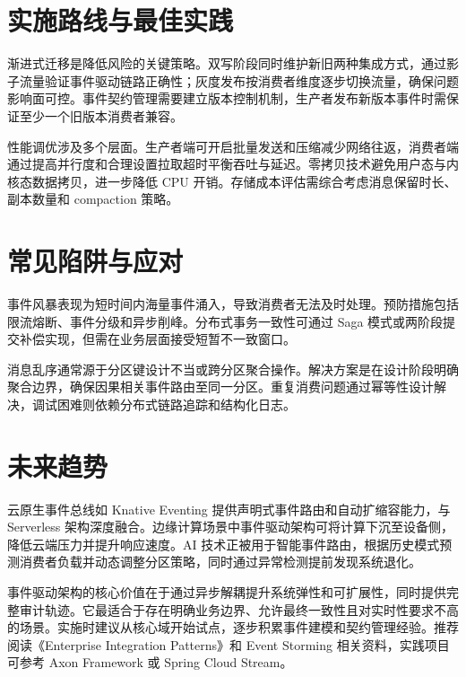 \chapter{实施路线与最佳实践}
渐进式迁移是降低风险的关键策略。双写阶段同时维护新旧两种集成方式，通过影子流量验证事件驱动链路正确性；灰度发布按消费者维度逐步切换流量，确保问题影响面可控。事件契约管理需要建立版本控制机制，生产者发布新版本事件时需保证至少一个旧版本消费者兼容。\par
性能调优涉及多个层面。生产者端可开启批量发送和压缩减少网络往返，消费者端通过提高并行度和合理设置拉取超时平衡吞吐与延迟。零拷贝技术避免用户态与内核态数据拷贝，进一步降低 CPU 开销。存储成本评估需综合考虑消息保留时长、副本数量和 compaction 策略。\par
\chapter{常见陷阱与应对}
事件风暴表现为短时间内海量事件涌入，导致消费者无法及时处理。预防措施包括限流熔断、事件分级和异步削峰。分布式事务一致性可通过 Saga 模式或两阶段提交补偿实现，但需在业务层面接受短暂不一致窗口。\par
消息乱序通常源于分区键设计不当或跨分区聚合操作。解决方案是在设计阶段明确聚合边界，确保因果相关事件路由至同一分区。重复消费问题通过幂等性设计解决，调试困难则依赖分布式链路追踪和结构化日志。\par
\chapter{未来趋势}
云原生事件总线如 Knative Eventing 提供声明式事件路由和自动扩缩容能力，与 Serverless 架构深度融合。边缘计算场景中事件驱动架构可将计算下沉至设备侧，降低云端压力并提升响应速度。AI 技术正被用于智能事件路由，根据历史模式预测消费者负载并动态调整分区策略，同时通过异常检测提前发现系统退化。\par
事件驱动架构的核心价值在于通过异步解耦提升系统弹性和可扩展性，同时提供完整审计轨迹。它最适合于存在明确业务边界、允许最终一致性且对实时性要求不高的场景。实施时建议从核心域开始试点，逐步积累事件建模和契约管理经验。推荐阅读《Enterprise Integration Patterns》和 Event Storming 相关资料，实践项目可参考 Axon Framework 或 Spring Cloud Stream。\par
